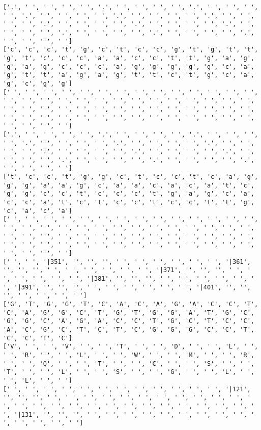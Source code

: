 \documentclass{article}
\begin{document}
\begin{Verbatim}
['.', ' ', ' ', ' ', ' ', '.', ' ', ' ', ' ', ' ', '.', ' ', ' ', ' ', ' ', '.', ' ', ' ', ' ', ' ', '.', ' ', ' ', ' ', ' ', '.', ' ', ' ', ' ', ' ', '.', ' ', ' ', ' ', ' ', '.', ' ', ' ', ' ', ' ', '.', ' ', ' ', ' ', ' ', '.', ' ', ' ', ' ', ' ', '.', ' ', ' ', ' ', ' ', '.', ' ', ' ', ' ', ' ']
['c', 'c', 'c', 't', 'g', 'c', 't', 'c', 'c', 'g', 't', 'g', 't', 't', 'g', 't', 'c', 'c', 'c', 'a', 'a', 'c', 'c', 't', 't', 'g', 'a', 'g', 'g', 'a', 'g', 'c', 'c', 'c', 'a', 'g', 'g', 'g', 'g', 'g', 'c', 'a', 'g', 't', 't', 'a', 'g', 'a', 'g', 't', 't', 'c', 't', 'g', 'c', 'a', 'g', 'c', 'g', 'g']
[' ', ' ', ' ', ' ', ' ', ' ', ' ', ' ', ' ', ' ', ' ', ' ', ' ', ' ', ' ', ' ', ' ', ' ', ' ', ' ', ' ', ' ', ' ', ' ', ' ', ' ', ' ', ' ', ' ', ' ', ' ', ' ', ' ', ' ', ' ', ' ', ' ', ' ', ' ', ' ', ' ', ' ', ' ', ' ', ' ', ' ', ' ', ' ', ' ', ' ', ' ', ' ', ' ', ' ', ' ', ' ', ' ', ' ', ' ', ' ']
['.', ' ', ' ', ' ', ' ', '.', ' ', ' ', ' ', ' ', '.', ' ', ' ', ' ', ' ', '.', ' ', ' ', ' ', ' ', '.', ' ', ' ', ' ', ' ', '.', ' ', ' ', ' ', ' ', '.', ' ', ' ', ' ', ' ', '.', ' ', ' ', ' ', ' ', '.', ' ', ' ', ' ', ' ', '.', ' ', ' ', ' ', ' ', '.', ' ', ' ', ' ', ' ', '.', ' ', ' ', ' ', ' ']
['t', 'c', 'c', 't', 'g', 'g', 'c', 't', 'c', 'c', 't', 'c', 'a', 'g', 'g', 'g', 'a', 'a', 'g', 'c', 'a', 'a', 'c', 'a', 'c', 'a', 't', 'c', 'g', 'g', 'c', 'c', 't', 'c', 'c', 'c', 't', 'g', 'a', 'g', 'c', 'a', 'c', 'c', 'a', 't', 'c', 't', 'c', 'c', 't', 'c', 'c', 't', 't', 'g', 'c', 'a', 'c', 'a']
[' ', ' ', ' ', ' ', ' ', ' ', ' ', ' ', ' ', ' ', ' ', ' ', ' ', ' ', ' ', ' ', ' ', ' ', ' ', ' ', ' ', ' ', ' ', ' ', ' ', ' ', ' ', ' ', ' ', ' ', ' ', ' ', ' ', ' ', ' ', ' ', ' ', ' ', ' ', ' ', ' ', ' ', ' ', ' ', ' ', ' ', ' ', ' ', ' ', ' ', ' ', ' ', ' ', ' ', ' ', ' ', ' ', ' ', ' ', ' ']
[' ', ' ', '|351', '', '', '', ' ', ' ', ' ', ' ', ' ', ' ', '|361', '', '', '', ' ', ' ', ' ', ' ', ' ', ' ', '|371', '', '', '', ' ', ' ', ' ', ' ', ' ', ' ', '|381', '', '', '', ' ', ' ', ' ', ' ', ' ', ' ', '|391', '', '', '', ' ', ' ', ' ', ' ', ' ', ' ', '|401', '', '', '', ' ', ' ', ' ', ' ']
['G', 'T', 'G', 'G', 'T', 'C', 'A', 'C', 'A', 'G', 'A', 'C', 'C', 'T', 'C', 'A', 'G', 'G', 'C', 'T', 'G', 'T', 'G', 'G', 'A', 'T', 'G', 'C', 'G', 'G', 'C', 'A', 'G', 'A', 'C', 'C', 'T', 'G', 'C', 'T', 'C', 'C', 'A', 'C', 'G', 'C', 'T', 'C', 'T', 'C', 'G', 'G', 'G', 'C', 'C', 'T', 'C', 'C', 'T', 'C']
['V', ' ', ' ', 'V', ' ', ' ', 'T', ' ', ' ', 'D', ' ', ' ', 'L', ' ', ' ', 'R', ' ', ' ', 'L', ' ', ' ', 'W', ' ', ' ', 'M', ' ', ' ', 'R', ' ', ' ', 'Q', ' ', ' ', 'T', ' ', ' ', 'C', ' ', ' ', 'S', ' ', ' ', 'T', ' ', ' ', 'L', ' ', ' ', 'S', ' ', ' ', 'G', ' ', ' ', 'L', ' ', ' ', 'L', ' ', ' ']
[' ', ' ', ' ', ' ', ' ', ' ', ' ', ' ', ' ', ' ', ' ', ' ', '|121', '', '', '', ' ', ' ', ' ', ' ', ' ', ' ', ' ', ' ', ' ', ' ', ' ', ' ', ' ', ' ', ' ', ' ', ' ', ' ', ' ', ' ', ' ', ' ', ' ', ' ', ' ', ' ', '|131', '', '', '', ' ', ' ', ' ', ' ', ' ', ' ', ' ', ' ', ' ', ' ', ' ', ' ', ' ', ' ']
  

\end{Verbatim}
\end{document}
